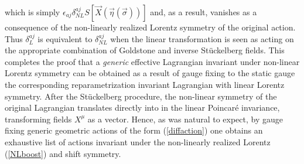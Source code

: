 \documentclass[%
 reprint,
 amsmath,amssymb,
 aps,
]{revtex4-1}
\begin{document}
which is simply $ \epsilon_{a j} \delta^{a j}_{NL} S \left[ \vec{X}(\vec{\eta}(\vec{\sigma}) )\right]$ and, as a result, vanishes as a consequence of
the non-linearly realized Lorentz symmetry of the original action.
Thus $\delta^{a j}_L$ is equivalent to $\delta^{a j}_{NL}$ when the linear transformation
is seen as acting on the appropriate combination of Goldstone and inverse
St\"uckelberg fields.
This completes the proof that a \emph{generic} effective Lagrangian invariant under non-linear Lorentz symmetry can
be obtained as a result of gauge fixing to the static gauge the corresponding reparametrization invariant Lagrangian
with linear Lorentz symmetry. After the St\"uckelberg procedure, the non-linear symmetry of the original Lagrangian
translates directly into in the linear Poincar\'e invariance, transforming fields $X^{\mu}$ as a vector.
Hence, as was natural to expect, by gauge fixing generic geometric actions of the form (\ref{diffaction}) one obtains an exhaustive list
of actions invariant under the non-linearly realized  Lorentz (\ref{NLboost}) and shift symmetry.

\end{document}
